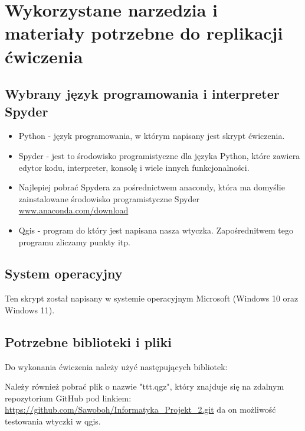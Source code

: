 \section{Wykorzystane narzedzia i materiały potrzebne do replikacji ćwiczenia}

\subsection{Wybrany język programowania i interpreter Spyder}

\begin{itemize}
\item Python - język programowania, w którym napisany jest skrypt ćwiczenia.
\item Spyder - jest to środowisko programistyczne dla języka Python, które zawiera edytor kodu, interpreter, konsolę i wiele innych funkcjonalności.
\item Najlepiej pobrać Spydera za pośrednictwem anacondy, która ma domyślie zainstalowane środowisko programistyczne Spyder \href{https://www.anaconda.com/download}{www.anaconda.com/download}	\citep{Anaconda}
\item Qgis - program do który jest napisana nasza wtyczka. Zapośrednitwem tego programu zliczamy punkty itp.
\end{itemize}

\subsection{System operacyjny}

Ten skrypt został napisany w systemie operacyjnym Microsoft (Windows 10 oraz Windows 11).

\subsection{Potrzebne biblioteki i pliki}

Do wykonania ćwiczenia należy użyć następujących bibliotek:
\begin{enumerate}


\end{enumerate}

Należy również pobrać plik o nazwie "ttt.qgz", który znajduje się na zdalnym repozytorium GitHub pod linkiem: \href{https://github.com/Sawoboh/Informatyka_Projekt_2.git}{https://github.com/Sawoboh/Informatyka\_Projekt\_2.git} da on możliwość testowania wtyczki w qgis.  